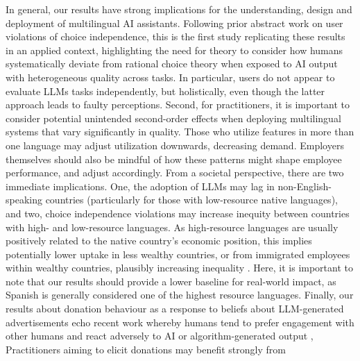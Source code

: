 In general, our results have strong implications for the understanding, design and deployment of multilingual AI assistants. Following prior abstract work on user violations of choice independence, this is the first study replicating these results in an applied context, highlighting the need for theory to consider how humans systematically deviate from rational choice theory when exposed to AI output with heterogeneous quality across tasks. In particular, users do not appear to evaluate LLMs tasks independently, but holistically, even though the latter approach leads to faulty perceptions. Second, for practitioners, it is important to consider potential unintended second-order effects when deploying multilingual systems that vary significantly in quality. Those who utilize features in more than one language may adjust utilization downwards, decreasing demand. Employers themselves should also be mindful of how these patterns might shape employee performance, and adjust accordingly. From a societal perspective, there are two immediate implications. One, the adoption of LLMs may lag in non-English-speaking countries (particularly for those with low-resource native languages), and two, choice independence violations may increase inequity between countries with high- and low-resource languages. As high-resource languages are usually positively related to the native country's economic position, this implies potentially lower uptake in less wealthy countries, or from immigrated employees within wealthy countries, plausibly increasing inequality \cite{noy2023experimental}. Here, it is important to note that our results should provide a lower baseline for real-world impact, as Spanish is generally considered one of the highest resource languages.  Finally, our results about donation behaviour as a response to beliefs about LLM-generated advertisements echo recent work whereby humans tend to prefer engagement with other humans and react adversely to AI or algorithm-generated output \cite{zhang2023human,bellaiche2023humans,millet2023defending,erlei2022s},  Practitioners aiming to elicit donations may benefit strongly from 